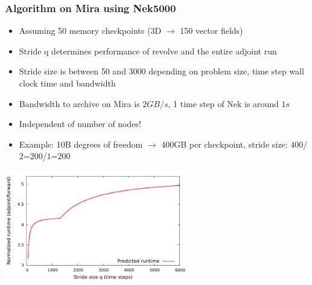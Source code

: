 \begin{frame}
  \frametitle{Algorithm on Mira using Nek5000}
  \begin{itemize}
    \item Assuming 50 memory checkpoints (3D $\rightarrow$ 150 vector fields)
    \item Stride q determines performance of revolve and the entire adjoint run
    \item Stride size is between 50 and 3000 depending on {\color{darkgreen}problem
      size}, {\color{blue}time step wall clock time} and {\color{red}bandwidth} 
    \item Bandwidth to archive on Mira is {\color{red}$2GB/s$}, 1 time step of
      Nek is around {\color{blue}$1s$}
    \item Independent of number of nodes!
    \item Example: 10B degrees of freedom $\rightarrow$ {\color{darkgreen}400GB} per checkpoint, stride size:
      {\color{darkgreen}$400$}/{\color{red}$2$}=200/{\color{blue}$1$}=200
  \end{itemize}
  \begin{center}
    \includegraphics[width=0.6\textwidth]{./figures/revolve_pred}
  \end{center}
\end{frame}


